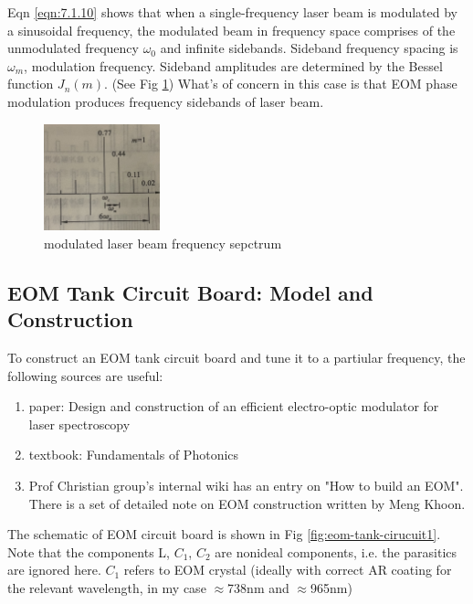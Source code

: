 \documentclass[11pt,A4Paper]{article}
\begin{document}
Eqn \ref{eqn:7.1.10} shows that when a single-frequency laser beam is modulated by a sinusoidal frequency, the modulated beam in frequency space comprises of the unmodulated frequency $\omega_0$ and infinite sidebands. Sideband frequency spacing is $\omega_m$, modulation frequency. 
Sideband amplitudes are determined by the Bessel function $J_n(m)$. (See Fig \ref{fig:EOMsidebandTheory}) What's of concern in this case is that EOM phase modulation produces frequency sidebands of laser beam. 

\begin{figure}[H]
    \centering
    \includegraphics[width=0.3\textwidth]{EOMsidebandTheory.png}
    \caption{modulated laser beam frequency sepctrum}
    \label{fig:EOMsidebandTheory}
\end{figure}

 \subsection{EOM Tank Circuit Board: Model and Construction}
To construct an EOM tank circuit board and tune it to a partiular frequency, the following sources are useful: 
\begin{enumerate}
    \item paper: Design and construction of an efficient electro-optic modulator for laser spectroscopy\cite{20MHzEOM}
    \item textbook: Fundamentals of Photonics\cite{fundamentalsOfPhotonics}
    \item Prof Christian group's internal wiki has an entry on "How to build an EOM". There is a set of detailed note on EOM construction written by Meng Khoon. 
\end{enumerate}
The schematic of EOM circuit board is shown in Fig \ref{fig:eom-tank-cirucuit1}. Note that the components L, $C_1$, $C_2$ are nonideal components, i.e. the parasitics are ignored here.
$C_1$ refers to EOM crystal (ideally with correct AR coating for the relevant wavelength, in my case $\approx$738nm and $\approx$965nm)
\end{document}
